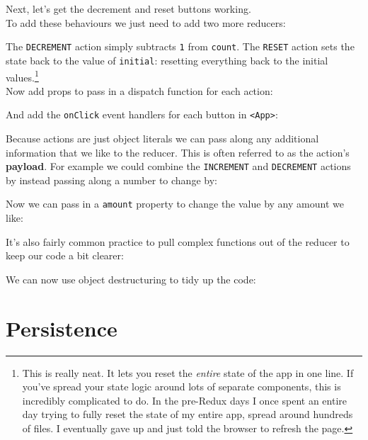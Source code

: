\hr


Next, let's get the decrement and reset buttons working.
\\

To add these behaviours we just need to add two more reducers:


The \texttt{DECREMENT} action simply subtracts \texttt{1} from \texttt{count}. The \texttt{RESET} action sets the state back to the value of \texttt{initial}: resetting everything back to the initial values.\footnote{This is really neat. It lets you reset the \textit{entire} state of the app in one line. If you've spread your state logic around lots of separate components, this is incredibly complicated to do. In the pre-Redux days I once spent an entire day trying to fully reset the state of my entire app, spread around hundreds of files. I eventually gave up and just told the browser to refresh the page.}
\\

Now add props to pass in a dispatch function for each action:


And add the \texttt{onClick} event handlers for each button in \texttt{<App>}:



Because actions are just object literals we can pass along any additional information that we like to the reducer. This is often referred to as the action's \textbf{payload}. For example we could combine the \texttt{INCREMENT} and \texttt{DECREMENT} actions by instead passing along a number to change by:


Now we can pass in a \texttt{amount} property to change the value by any amount we like:



It's also fairly common practice to pull complex functions out of the reducer to keep our code a bit clearer:



We can now use object destructuring to tidy up the code:



\section{Persistence}

